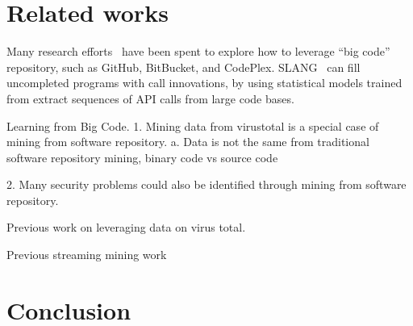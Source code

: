 \section{Related works}

Many research efforts~\cite{bigcode, big-lessons,code-completion} 
have been spent to explore how to leverage ``big code'' repository, 
such as GitHub, BitBucket, and CodePlex. 
SLANG~\cite{code-completion} can fill uncompleted programs with call innovations, 
by using statistical models trained from extract sequences of API calls from large code bases.  

Learning from Big Code. 
1. Mining data from virustotal is a special case of  mining from software repository. 
a. Data is not the same from traditional software repository mining, binary code vs source code

2. Many security problems could also be identified through mining from software repository. 

Previous work on leveraging data on virus total. 

Previous streaming mining work

\section{Conclusion}
